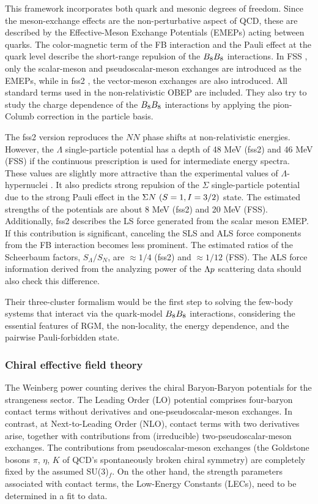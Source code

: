 This framework incorporates both quark and mesonic degrees of freedom. Since the meson-exchange effects are the non-perturbative aspect of QCD, these are described by the Effective-Meson Exchange Potentials (EMEPs) acting between quarks. The color-magnetic term of the FB interaction and the Pauli effect at the quark level describe the short-range repulsion of the $B_{8}B_{8}$ interactions. In FSS \cite{FSS}, only the scalar-meson and pseudoscalar-meson exchanges are introduced as the EMEPs, while in fss2 \cite{fss2}, the vector-meson exchanges are also introduced. All standard terms used in the non-relativistic OBEP are included. They also try to study the charge dependence of the $B_{8}B_{8}$ interactions by applying the pion-Columb correction in the particle basis. 

The fss2 version reproduces the $NN$ phase shifts at non-relativistic energies. However, the $\Lambda$ single-particle potential has a depth of 48 MeV (fss2) and 46 MeV (FSS) if the continuous prescription is used for intermediate energy spectra. These values are slightly more attractive than the experimental values of $\Lambda$-hypernuclei \cite{Bando-1990}. It also predicts strong repulsion of the $\Sigma$ single-particle potential due to the strong Pauli effect in the $\Sigma N\ (S = 1, I = 3/2)$ state. The estimated strengths of the potentials are about 8 MeV (fss2) and 20 MeV (FSS). %
Additionally, fss2 describes the LS force generated from the scalar meson EMEP. If this contribution is significant, canceling the SLS and ALS force components from the FB interaction becomes less prominent. The estimated ratios of the Scheerbaum factors, $S_{\Lambda}/S_N$, are $\approx1/4$ (fss2) and $\approx1/12$ (FSS). The ALS force information derived from the analyzing power of the $\Lambda p$ scattering data should also check this difference. 

Their three-cluster formalism would be the first step to solving the few-body systems that interact via the quark-model $B_{8}B_{8}$ interactions, considering the essential features of RGM, the non-locality, the energy dependence, and the pairwise Pauli-forbidden state.


\subsubsection{Chiral effective field theory}
The Weinberg power counting derives the chiral Baryon-Baryon potentials for the strangeness sector. The Leading Order (LO) potential comprises four-baryon contact terms without derivatives and one-pseudoscalar-meson exchanges. In contrast, at Next-to-Leading Order (NLO), contact terms with two derivatives arise, together with contributions from (irreducible) two-pseudoscalar-meson exchanges. The contributions from pseudoscalar-meson exchanges (the Goldstone bosons $\pi$, $\eta$, $K$ of QCD's spontaneously broken chiral symmetry) are completely fixed by the assumed SU(3)$_f$. On the other hand, the strength parameters associated with contact terms, the Low-Energy Constants (LECs), need to be determined in a fit to data. 

